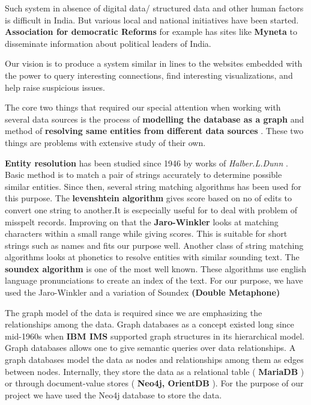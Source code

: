 Such system in absence of digital data/ structured data and other human factors is difficult in India. But various local and national initiatives have been started. \textbf{Association for democratic Reforms} \cite{ADR} for example has sites like \textbf{Myneta} \cite{MyNeta} to disseminate information about political leaders of India.	

Our vision is to produce a system similar in lines to the websites embedded with the power to query interesting connections, find interesting visualizations, and help raise suspicious issues.

The core two things that required our special attention when working with several data sources is the process of \textbf{ modelling the database as a graph } and method of \textbf{ resolving same entities from different data sources }. These two things are problems with extensive study of their own.

\textbf{ Entity resolution } has been studied since 1946 by works of \emph{ Halber.L.Dunn }\cite{dunn}. Basic method is to match a pair of strings accurately to determine possible similar entities. Since then, several string matching algorithms has been used for this purpose. The \textbf{ levenshtein algorithm } \cite{levenshtein} gives score based on no of edits to convert one string to another.It is escpecially useful for to deal with problem of misspelt records. Improving on that the \textbf{ Jaro-Winkler} \cite{jwinkler} looks at matching characters within a small range while giving scores. This is suitable for short strings such as names and fits our purpose well. Another class of string matching algorithms looks at phonetics to resolve entities with similar sounding text. The \textbf{ soundex algorithm }\cite{knuth} is one of the most well known. These algorithms use english language pronunciations to create an index of the text. For our purpose, we have used the Jaro-Winkler and a variation of Soundex \textbf{ (Double Metaphone) }\cite{philips}

    The graph model of the data is required since we are emphasizing the relationships among the data. Graph databases as a concept existed long since mid-1960s when \textbf{ IBM IMS } \cite{korth} \cite{ims} supported graph structures in its hierarchical model. Graph databases allows one to give semantic queries  over data relationships. A graph databases model the data as nodes and relationships among them as edges between nodes. Internally, they store the data as a relational table (\textbf{ MariaDB }\cite{maria}) or through document-value stores (\textbf{ Neo4j, OrientDB }\cite{neo}\cite{orient}). For the purpose of our project we have used the Neo4j database to store the data. 

